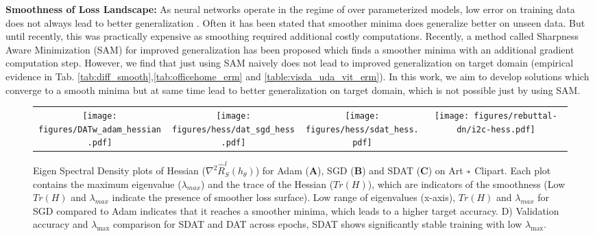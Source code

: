 \documentclass[table,dvipsnames]{article}
\newcommand{\veryshortarrow}[1][3pt]{\mathrel{\hbox{\rule[\dimexpr\fontdimen22\textfont2-.2pt\relax]{#1}{.4pt}}\mkern-4mu\hbox{\usefont{U}{lasy}{m}{n}\symbol{41}}}} \newcommand{\cmark}{\ding{51}}\newcommand{\xmark}{\ding{55}}\usepackage{amssymb}\usepackage{pifont}\usepackage[hyphens]{url}
\theoremstyle{plain}
\theoremstyle{definition}
\theoremstyle{remark}
\begin{document}
{\textbf{Smoothness of Loss Landscape:} As neural networks operate in the regime of over parameterized models, low error on training data does not always lead to better generalization \citep{keskar2017large}. Often it has been stated \citep{hochreiter1997flat, hochreiter1994simplifying, he2019asymmetric, dziugaite2017computing}  that smoother minima does generalize better on unseen data. But until recently, this was practically expensive as smoothing required additional costly computations. Recently, a method called Sharpness Aware Minimization (SAM) \citep{foret2021sharpnessaware} for improved generalization has been proposed which finds a smoother minima with an additional gradient computation step. However, we find that just using SAM naively does not lead to improved generalization on target domain (empirical evidence in Tab. \ref{tab:diff_smooth},\ref{tab:officehome_erm} and \ref{table:visda_uda_vit_erm}). In this work, we aim to develop solutions which converge to a smooth minima but at same time lead to better generalization on target domain, which is not possible just by using SAM. }
\begin{figure*}[!t]
\centering
\begin{tabular}{c c c c}
\hspace{-0.4cm}\texttt{[image: figures/DATw\_adam\_hessian.pdf]} &   \hspace{-0.4cm}\texttt{[image: figures/hess/dat\_sgd\_hess.pdf]} &
\hspace{-0.4cm}\texttt{[image: figures/hess/sdat\_hess.pdf]} & \hspace{-0.4cm}\texttt{[image: figures/rebuttal-dn/i2c-hess.pdf]} \\
\end{tabular}
\caption{Eigen Spectral Density plots of Hessian ($\nabla^2 \hat{R}_{S}^l(h_{\theta})$) for Adam (\textbf{A}), SGD (\textbf{B}) and SDAT (\textbf{C}) on Art $\veryshortarrow$ Clipart. Each plot contains the maximum eigenvalue ($\lambda_{max}$) and the trace of the Hessian ($Tr(H)$), which are indicators of the smoothness (Low $Tr(H)$ and $\lambda_{max}$ indicate the presence of smoother loss surface). Low range of eigenvalues (x-axis), $Tr(H)$ and $\lambda_{max}$ for SGD compared to Adam indicates that it reaches a smoother minima, which leads to a higher target accuracy. D) Validation accuracy and $\lambda_{\max}$ comparison for SDAT and DAT across epochs, SDAT shows significantly stable training with low $\lambda_{\max}$. }
\label{fig:hessian}
\end{figure*}
\end{document}
